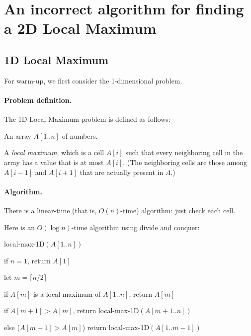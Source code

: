 \section{An incorrect algorithm for finding a 2D Local Maximum}\label{dc: sec: local max}

\subsection{1D Local Maximum}\label{dc: sec: 1D local max}
For warm-up, we first consider the 1-dimensional problem.

\paragraph{Problem definition.}
The 1D Local Maximum problem is defined as follows:

\begin{mylist}

\item[\textbf{input:}] An array $A[1..n]$ of numbers.

\item[\textbf{output:}]
A \emph{local maximum}, which is a cell $A[i]$ such that every neighboring cell in the array has a value that is at most $A[i]$.  (The neighboring cells are those among $A[i-1]$ and $A[i+1]$ that are actually present in $A$.) 

\end{mylist}

\paragraph{Algorithm.}
There is a linear-time (that is, $O(n)$-time) algorithm: just check each cell.

Here is an $O(\log n)$-time algorithm using divide and conquer:

\begin{myframed}\small
  \begin{steps}
  \item[] {\sf local-max-1D}$(A[1..n])$

    \step if $n = 1$, return $A[1]$

    \step let $m = \lceil n/2\rceil$

    \step if $A[m]$ is a local maximum of $A[1..n]$, return $A[m]$

    \step if $A[m+1] > A[m]$, return {\sf local-max-1D}$(A[m+1..n])$

    \step else ($A[m-1] > A[m]$)  return {\sf local-max-1D}$(A[1..m-1])$
  \end{steps}
\end{myframed}  

